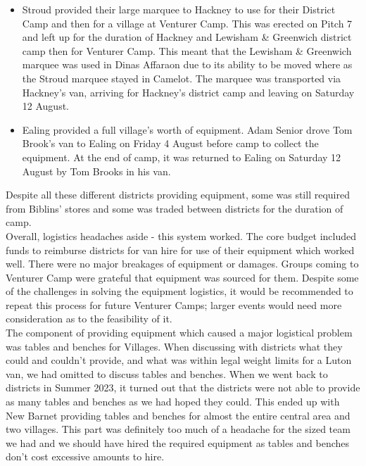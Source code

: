\begin{itemize}
    \item Stroud provided their large marquee to Hackney to use for their District Camp and then for a village at Venturer Camp. This was erected on Pitch 7 and left up for the duration of Hackney and Lewisham \& Greenwich district camp then for Venturer Camp. This meant that the Lewisham \& Greenwich marquee was used in Dinas Affaraon due to its ability to be moved where as the Stroud marquee stayed in Camelot. The marquee was transported via Hackney's van, arriving for Hackney's district camp and leaving on Saturday 12 August.
    \item Ealing provided a full village's worth of equipment. Adam Senior drove Tom Brook's van to Ealing on Friday 4 August before camp to collect the equipment. At the end of camp, it was returned to Ealing on Saturday 12 August by Tom Brooks in his van.
\end{itemize}

Despite all these different districts providing equipment, some was still required from Biblins' stores and some was traded between districts for the duration of camp. \\

Overall, logistics headaches aside - this system worked. The core budget included funds to reimburse districts for van hire for use of their equipment which worked well. There were no major breakages of equipment or damages. Groups coming to Venturer Camp were grateful that equipment was sourced for them. Despite some of the challenges in solving the equipment logistics, it would be recommended to repeat this process for future Venturer Camps; larger events would need more consideration as to the feasibility of it. \\

The component of providing equipment which caused a major logistical problem was tables and benches for Villages. When discussing with districts what they could and couldn't provide, and what was within legal weight limits for a Luton van, we had omitted to discuss tables and benches. When we went back to districts in Summer 2023, it turned out that the districts were not able to provide as many tables and benches as we had hoped they could. This ended up with New Barnet providing tables and benches for almost the entire central area and two villages. This part was definitely too much of a headache for the sized team we had and we should have hired the required equipment as tables and benches don't cost excessive amounts to hire. 


